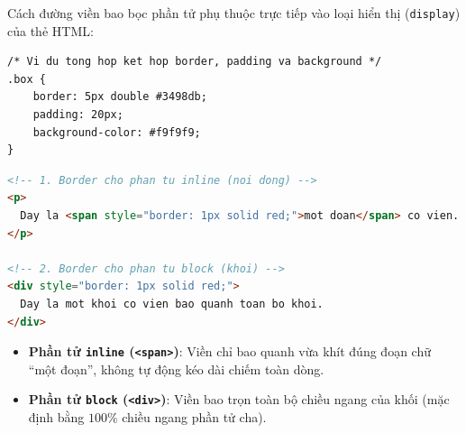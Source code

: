 \documentclass[11pt,oneside]{book}
\newcommand{\codeinline}[1]{\textcolor{accentOrange}{\texttt{#1}}}
\begin{document}
Cách đường viền bao bọc phần tử phụ thuộc trực tiếp vào loại hiển thị (\codeinline{display}) của thẻ HTML:

\begin{codeWindow}
\begin{lstlisting}[language=CSS3]
/* Vi du tong hop ket hop border, padding va background */
.box {
    border: 5px double #3498db;
    padding: 20px;
    background-color: #f9f9f9;
}
\end{lstlisting}
\begin{lstlisting}[language=HTML]
<!-- 1. Border cho phan tu inline (noi dong) -->
<p>
  Day la <span style="border: 1px solid red;">mot doan</span> co vien.
</p>

<!-- 2. Border cho phan tu block (khoi) -->
<div style="border: 1px solid red;">
  Day la mot khoi co vien bao quanh toan bo khoi.
</div>
\end{lstlisting}
\end{codeWindow}

\begin{browserWindow}
\centering
{}
\end{browserWindow}

\begin{itemize}[leftmargin=1.5em, itemsep=2.5pt, parsep=0pt]
    \item \textbf{Phần tử \codeinline{inline} (\codeinline{<span>})}: Viền chỉ bao quanh vừa khít đúng đoạn chữ ``một đoạn'', không tự động kéo dài chiếm toàn dòng.
    \item \textbf{Phần tử \codeinline{block} (\codeinline{<div>})}: Viền bao trọn toàn bộ chiều ngang của khối (mặc định bằng $100\%$ chiều ngang phần tử cha).
\end{itemize}
\end{document}
